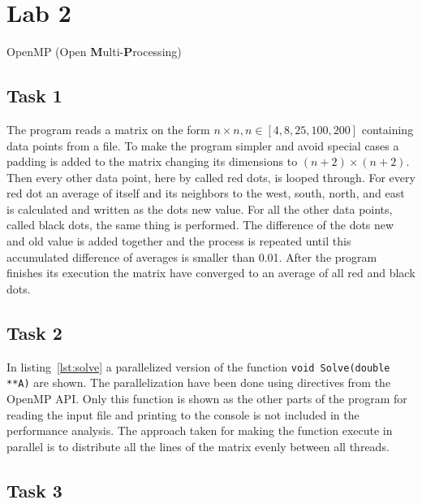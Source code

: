 \section{Lab 2}
\label{sec:lab2}
OpenMP (Open \textbf Multi-\textbf Processing)

\subsection{Task 1}

The program reads a matrix on the form $n \times n, n \in [4,8,25,100,200]$ containing data points from a file. To make the program simpler and avoid special cases a padding is added to the matrix changing its dimensions to $(n+2) \times (n+2)$. Then every other data point, here by called red dots, is looped through. For every red dot an average of itself and its neighbors to the west, south, north, and east is calculated and written as the dots new value. For all the other data points, called black dots, the same thing is performed. The difference of the dots new and old value is added together and the process is repeated until this accumulated difference of averages is smaller than 0.01. After the program finishes its execution the matrix have converged to an average of all red and black dots.

\subsection{Task 2}
In listing~\ref{lst:solve} a parallelized version of the function \texttt{void Solve(double **A)} are shown. The parallelization have been done using directives from the OpenMP API. Only this function is shown as the other parts of the program for reading the input file and printing to the console is not included in the performance analysis. The approach taken for making the function execute in parallel is to distribute all the lines of the matrix evenly between all threads. 




\subsection{Task 3}



